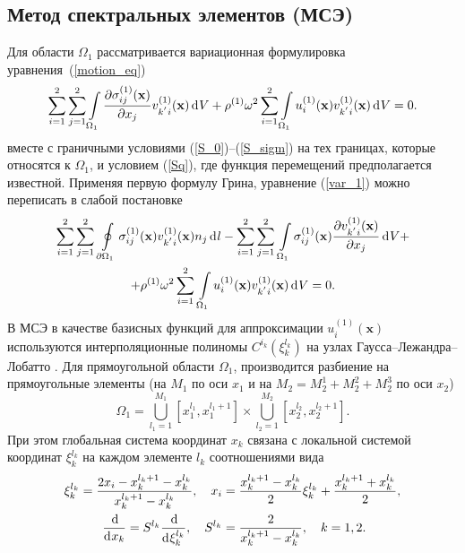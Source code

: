 \documentclass[press]{vestnik}
\begin{document}
	\subsection{Метод спектральных элементов (МСЭ)}
Для области $\Omega_{1}$ рассматривается вариационная формулировка уравнения~(\ref{motion_eq})
\begin{equation} \label{var_1}
	\sum_{i=1}^{2} \sum_{j=1}^{2} \int\limits_{\Omega_1} 
	\frac{\partial \sigma_{ij}^{(1)}(\bm{x}) }{\partial x_{j} } v_{k^{'}i}^{(1)}(\bm{x}) \d V + \rho^{(1)} \omega^{2} \sum_{i=1}^{2} \int\limits_{\Omega_1} u_{i}^{(1)}(\bm{x}) v_{k^{'}i}^{(1)}(\bm{x}) \d V = 0.
\end{equation}
вместе с граничными условиями (\ref{S_0})–(\ref{S_sigm}) на тех границах, которые относятся к $\Omega_{1}$, и условием (\ref{Sq}), где функция перемещений предполагается известной. Применяя первую формулу Грина, уравнение (\ref{var_1}) можно переписать в слабой постановке
\begin{multline} \label{weak_form1}
	\sum_{i=1}^{2} \sum_{j=1}^{2} \,\oint\limits_{\partial \Omega_1} \sigma_{ij}^{(1)}(\bm{x}) v_{k^{'}i}^{(1)}(\bm{x}) n_{j} \d l - \sum_{i=1}^{2} \sum_{j=1}^{2} \,\int\limits_{\Omega_1} \sigma_{ij}^{(1)}(\bm{x}) \frac{\partial v_{k^{'}i}^{(1)}(\bm{x}) }{\partial x_{j} } \d V + 
	\\
	+\rho^{(1)} \omega^{2} \sum_{i=1}^{2} \,\int\limits_{\Omega_1} u_{i}^{(1)}(\bm{x}) v_{k^{'}i}^{(1)}(\bm{x}) \d V = 0.
\end{multline}
В МСЭ в качестве базисных функций для аппроксимации $u_{i}^{(1)}({\bm{x}})$ используются интерполяционные полиномы $C^{i_{k}} (\xi_{k}^{l_{k}})$  на узлах Гаусса--Лежандра--Лобатто \cite{Golub_2015}. Для прямоугольной области $\Omega_{1}$, производится разбиение на прямоугольные элементы (на $M_{1}$ по оси $x_{1}$ и на $M_{2}=M_{2}^{1}+M_{2}^{2}+M_{2}^{3}$ по оси $x_{2}$)
$$
\Omega_{1}=\bigcup_{l_{1}=1}^{M_{1}} \left[x_{1}^{l_{1}}, x_{1}^{l_{1}+1}\right] \times \bigcup_{l_{2}=1}^{M_{2}} \left[x_{2}^{l_{2}}, x_{2}^{l_{2}+1}\right].
$$
При этом глобальная система координат $x_{k}$ связана с локальной системой координат $\xi_{k}^{l_{k}}$ на каждом элементе $l_{k}$ соотношениями вида
\begin{equation*}
	\begin{split}
		\xi_{k}^{l_k} = \frac{2 x_i - x_{k}^{l_k + 1} -x_{k}^{l_k}}{x_{k}^{l_k + 1} -x_{k}^{l_k}},\quad x_i &= \frac{x_{k}^{l_k + 1} -x_{k}^{l_k}}{2} \xi_{k}^{l_k} + \frac{x_{k}^{l_k + 1} + x_{k}^{l_k}}{2},	\\
		\frac{\d }{\d  x_k} = S^{l_k} \frac{\d }{\d  \xi_{k}^{l_k}},\quad S^{l_k} &= \frac{2}{x_{k}^{l_k + 1} -x_{k}^{l_k}},\quad k=1, 2.
	\end{split}
\end{equation*}
\end{document}
